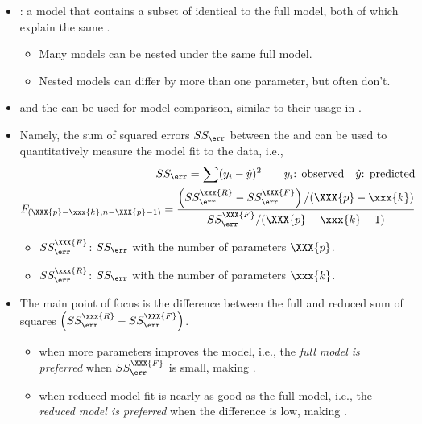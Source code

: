 \begin{itemize}
\begin{itemize}
    \item {}: a model that contains a subset of identical  to the full model, both of which explain the same .
      \begin{itemize}
        \item Many models can be nested under the same full model.
        \item Nested models can differ by more than one parameter, but often don't.
      \end{itemize}
      \item \hyperref[Subsection: Sum of Squares]{} and the \hyperref[Subsection: F-Test]{} can be used for model comparison, similar to their usage in \hyperref[Subsection: Model Significance]{}.
      \item Namely, the sum of squared errors \(SS_\err\) between the  and  can be used to quantitatively measure the model fit to the data, i.e.,
      \begin{align*}
        SS_\err = \sum(y_i - \hat{y})^2 \qquad y_i\text{: observed}\quad  \hat{y}\text{: predicted} \\
        F_{(\XXX{p} - \xxx{k}, n - \XXX{p} -1)} = \frac{\left(SS^{\xxx{R}}_\err - SS^{\XXX{F}}_\err\right)/(\XXX{p}-\xxx{k})}{SS^{\XXX{F}}_\err / (\XXX{p} - \xxx{k} - 1)}
      \end{align*}
      \begin{itemize}
        \item \(SS^{\XXX{F}}_\err \):  \(SS_\err\) with the  number of parameters \(\XXX{p}\).
        \item \(SS^{\xxx{R}}_\err \):  \(SS_\err\) with the  number of parameters \(\xxx{k}\).
      \end{itemize}
      \item The main point of focus is the difference between the full and reduced sum of squares \(\left(SS^{\xxx{R}}_\err - SS^{\XXX{F}}_\err\right)\).
        \begin{itemize}
          \item {} when more parameters improves the model, i.e., the \emph{full model is preferred} when \(SS^{\XXX{F}}_\err\) is small, making .
          \item {} when reduced model fit is nearly as good as the full model, i.e., the \emph{reduced model is preferred} when the difference is low, making .

\end{itemize}
\end{itemize}
\end{itemize}
